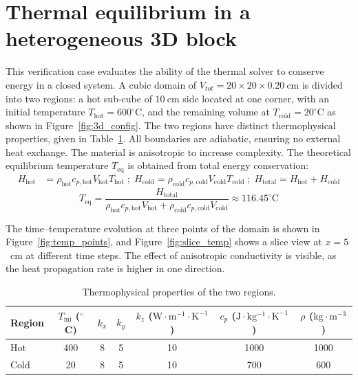 \documentclass[12pt]{article}
\begin{document}
\fi

\section{Thermal equilibrium in a heterogeneous 3D block}

This verification case evaluates the ability of the thermal solver to conserve energy in a closed system.  
A cubic domain of $V_{tot}=20\times 20\times 0.20~\mathrm{cm}$ is divided into two regions:  
a hot sub‐cube of $10~\mathrm{cm}$ side located at one corner, with an initial temperature $T_\mathrm{hot} = 600^\circ\mathrm{C}$, and the remaining volume at $T_\mathrm{cold} = 20^\circ\mathrm{C}$ as shown in Figure~\ref{fig:3d_config}.  
The two regions have distinct thermophysical properties, given in Table~\ref{tab:phys_props}.  
All boundaries are adiabatic, ensuring no external heat exchange.  
The material is anisotropic to increase complexity.  
The theoretical equilibrium temperature $T_\mathrm{eq}$ is obtained from total energy conservation:
\begin{align}
H_\mathrm{hot} &= \rho_\mathrm{hot} c_{p,\mathrm{hot}} V_\mathrm{hot} T_\mathrm{hot} \; ; \;
H_\mathrm{cold} = \rho_\mathrm{cold} c_{p,\mathrm{cold}} V_\mathrm{cold} T_\mathrm{cold} \; ; \;
H_\mathrm{total} = H_\mathrm{hot} + H_\mathrm{cold}
\end{align}
\begin{equation}
T_\mathrm{eq} = \frac{H_\mathrm{total}}{\rho_\mathrm{hot} c_{p,\mathrm{hot}} V_\mathrm{hot} + \rho_\mathrm{cold} c_{p,\mathrm{cold}} V_\mathrm{cold}} \approx 116.45^\circ\mathrm{C}
\end{equation}

The time–temperature evolution at three points of the domain is shown in Figure~\ref{fig:temp_points}, and Figure~\ref{fig:slice_temp} shows a slice view at $x=5$~cm at different time steps.  
The effect of anisotropic conductivity is visible, as the heat propagation rate is higher in one direction.
\begin{table}[H]
\centering
\caption{Thermophysical properties of the two regions.}
\label{tab:phys_props}
\footnotesize
\begin{tabular}{@{}lcccccc@{}}
\toprule
Region & $T_{\mathrm{ini}}$ ($^\circ$C) &
$k_x$ &
$k_y$ &
$k_z$ ($\mathrm{W \cdot m^{-1} \cdot K^{-1}}$) &
$c_p$ ($\mathrm{J \cdot kg^{-1} \cdot K^{-1}}$) &
$\rho$ ($\mathrm{kg \cdot m^{-3}}$) \\
\midrule
Hot  & 400 & 8 & 5 & 10 & 1000 & 1000 \\
Cold & 20  & 8 & 5 & 10 & 700  & 600 \\
\bottomrule
\end{tabular}
\end{table}
\end{document}
